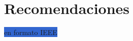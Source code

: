 \documentclass[12pt,a4paper]{report}
\begin{document}
\section*{Recomendaciones}


\vspace{0.5cm}

\renewcommand{\bibname}{\MakeUppercase{REFERENCIAS}}


\colorbox{highlight}{en formato IEEE}
\end{document}
